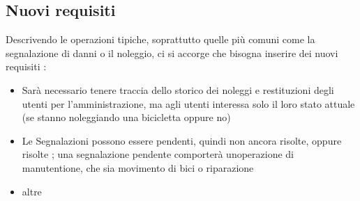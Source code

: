 \documentclass[a4paper,twoside]{article}
\begin{document}
\subsection{Nuovi requisiti}
Descrivendo le operazioni tipiche, soprattutto quelle più comuni come la segnalazione di danni o il noleggio, ci si accorge che bisogna inserire dei nuovi requisiti :
\begin{itemize}
 \item Sarà necessario tenere traccia dello storico dei noleggi e restituzioni degli utenti per l'amministrazione, ma agli utenti interessa solo il loro stato attuale (se stanno noleggiando una bicicletta oppure no)
 \item Le Segnalazioni possono essere pendenti, quindi non ancora risolte, oppure risolte ; una segnalazione pendente comporterà unoperazione di manutentione, che sia movimento  di bici o riparazione
 \item altre
\end{itemize}
\end{document}
